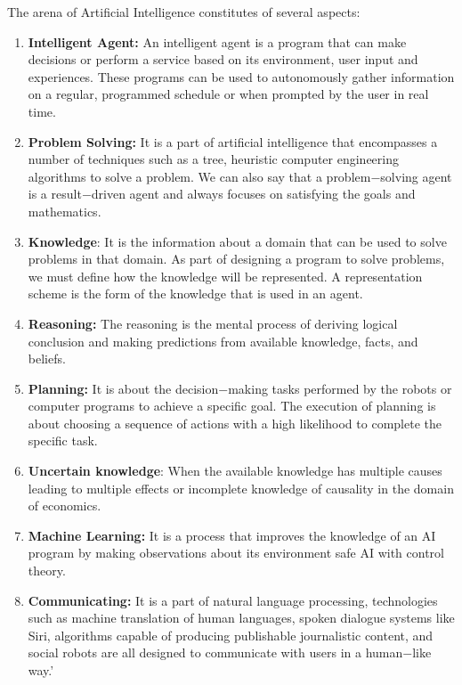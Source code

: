 \documentclass{article}
\begin{document}
The arena of Artificial Intelligence constitutes of several aspects:

\begin{enumerate}
	\item \textbf{Intelligent Agent: }An intelligent agent is a program that can make decisions or perform a service based on its environment, user input and experiences. These programs can be used to autonomously gather information on a regular, programmed schedule or when prompted by the user in real time.

	\item \textbf{Problem Solving: }It is a part of artificial intelligence that encompasses a number of techniques such as a tree, heuristic computer engineering algorithms to solve a problem. We can also say that a problem$-$solving agent is a result$-$driven agent and always focuses on satisfying the goals and mathematics.

	\item \textbf{Knowledge}: It is the information about a domain that can be used to solve problems in that domain. As part of designing a program to solve problems, we must define how the knowledge will be represented. A representation scheme is the form of the knowledge that is used in an agent.

	\item \textbf{Reasoning: }The reasoning is the mental process of deriving logical conclusion and making predictions from available knowledge, facts, and beliefs.

	\item \textbf{Planning:} It is about the decision$-$making tasks performed by the robots or computer programs to achieve a specific goal. The execution of planning is about choosing a sequence of actions with a high likelihood to complete the specific task.

	\item \textbf{Uncertain knowledge}: When the available knowledge has multiple causes leading to multiple effects or incomplete knowledge of causality in the domain of economics.

	\item \textbf{Machine Learning: }It is a process that improves the knowledge of an AI program by making observations about its environment safe AI with control theory.

	\item \textbf{Communicating:} It is a part of natural language processing, technologies such as machine translation of human languages, spoken dialogue systems like Siri, algorithms capable of producing publishable journalistic content, and social robots are all designed to communicate with users in a human$-$like way.’


\end{enumerate}
\end{document}
